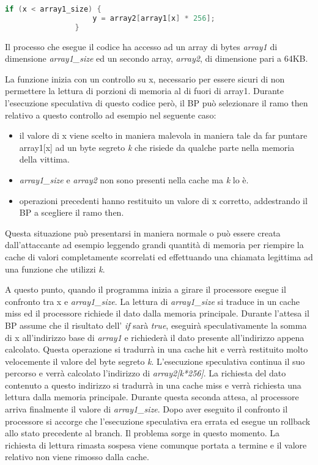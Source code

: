 			\begin{lstlisting}[language={C}, frame={none},basicstyle={\footnotesize}]
				if (x < array1_size) {
					y = array2[array1[x] * 256];
				}
			\end{lstlisting}
			
			Il processo che esegue il codice ha accesso ad un array di bytes \emph{array1} di dimensione \emph{array1\_size} ed un secondo array, \emph{array2}, di dimensione pari a 64KB.
			
			La funzione inizia con un controllo su x, necessario per essere sicuri di non permettere la lettura di porzioni di memoria al di fuori di array1. Durante l'esecuzione speculativa di questo codice però, il \ac{BP} può selezionare il ramo then relativo a questo controllo ad esempio nel seguente caso:
			
			\begin{itemize}
				\item il valore di x viene scelto in maniera malevola in maniera tale da far puntare array1[x] ad un byte segreto \emph{k} che risiede da qualche parte nella memoria della vittima.
				\item \emph{array1\_size} e \emph{array2} non sono presenti nella cache ma \emph{k} lo è.
				\item operazioni precedenti hanno restituito un valore di x corretto, addestrando il \ac{BP} a scegliere il ramo then.
			\end{itemize}
		
			Questa situazione può presentarsi in maniera normale o può essere creata dall'attaccante ad esempio leggendo grandi quantità di memoria per riempire la cache di valori completamente scorrelati ed effettuando una chiamata legittima ad una funzione che utilizzi \emph{k}.
			
			A questo punto, quando il programma inizia a girare il processore esegue il confronto tra x e \emph{array1\_size}. La lettura di \emph{array1\_size} si traduce in un cache miss ed il processore richiede il dato dalla memoria principale. Durante l'attesa il \ac{BP} assume che il risultato dell' \emph{if} sarà \emph{true}, eseguirà speculativamente la somma di x all'indirizzo base di \emph{array1} e richiederà il dato presente all'indirizzo appena calcolato. Questa operazione si tradurrà in una cache hit e verrà restituito molto velocemente il valore del byte segreto \emph{k}. L'esecuzione speculativa continua il suo percorso e verrà calcolato l'indirizzo di \emph{array2[k*256]}. La richiesta del dato contenuto a questo indirizzo si tradurrà in una cache miss e verrà richiesta una lettura dalla memoria principale. Durante questa seconda attesa, al processore arriva finalmente il valore di \emph{array1\_size}. Dopo aver eseguito il confronto il processore si accorge che l'esecuzione speculativa era errata ed esegue un rollback allo stato precedente al branch. Il problema sorge in questo momento. La richiesta di lettura rimasta sospesa viene comunque portata a termine e il valore relativo non viene rimosso dalla cache.
			
